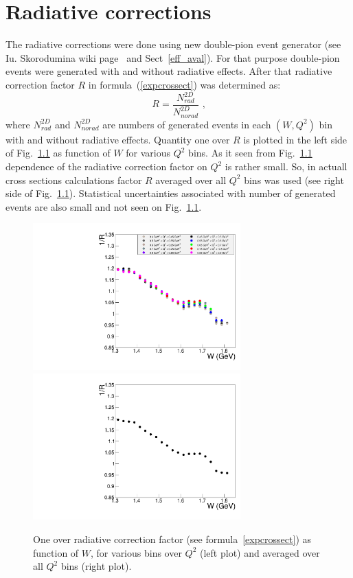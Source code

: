 \chapter{Radiative corrections}
\label{radiative}

The radiative corrections were done using new double-pion event generator (see Iu. Skorodumina wiki page~\cite{Skorodum:EG} and Sect~\ref{eff_aval}). For that purpose double-pion events were generated with and without radiative effects.  After that radiative
correction factor $R$ in formula~(\ref{expcrossect})
was determined as:
\begin{equation}
\label{radcorrfact}
R = \frac{N_{rad}^{2D}}{N_{norad}^{2D}} \textrm{ ,}
\end{equation}
where $N_{rad}^{2D}$ and $N_{norad}^{2D}$ are
numbers of generated events in each $(W, Q^{2})$ bin
with and without radiative effects.
Quantity one over $R$ is plotted in the left side of Fig.~\ref{radcorrfact} as function of $W$ for various $Q^{2}$ bins. As it seen from Fig.~\ref{radcorrfact} dependence of the radiative correction factor on $Q^{2}$ is rather small. So, in actuall cross sections calculations factor $R$ averaged over all $Q^{2}$ bins was used (see right side of Fig.~\ref{radcorrfact}). Statistical uncertainties associated with number of generated events are also small and not seen on Fig.~\ref{radcorrfact}.

\begin{figure}[htp]
\begin{center}
\includegraphics[width=8cm]{pictures/rad_corr/rad_corr_all_q2.pdf}
\includegraphics[width=8cm]{pictures/rad_corr/rad_corr_avrg.pdf}
\caption{\small One over radiative correction factor (see formula~\ref{expcrossect})
as function of $W$, for various bins over $Q^{2}$ (left plot) and averaged over all  $Q^{2}$ bins (right plot).} \label{radcorrfact}
\end{center}
\end{figure}

